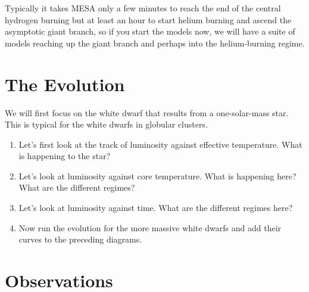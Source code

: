 \documentclass{article}
\begin{document}
Typically it takes MESA only a few minutes to reach the end of the central hydrogen burning but at least an hour to start helium burning and ascend the asymptotic giant branch, so if you start the models now, we will have a suite of models reaching up the giant branch and perhaps into the helium-burning regime.

\section{The Evolution}

We will first focus on the white dwarf that results from a one-solar-mass star.  This is typical for the white dwarfs in globular clusters.

\begin{enumerate}
\item Let's first look at the track of luminosity against effective temperature.  What is happening to the star?
\item Let's look at luminosity against core temperature.  What is happening here?  What are the different regimes?
\item Let's look at luminosity against time.  What are the different regimes here?
\item 
Now run the evolution for the more massive white dwarfs and add their curves to the preceding diagrams.
\end{enumerate}

\section{Observations}

 
\end{document}
